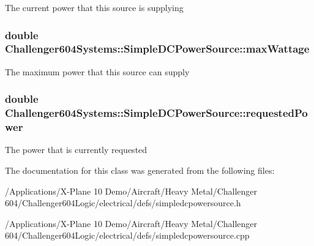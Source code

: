 The current power that this source is supplying \hypertarget{class_challenger604_systems_1_1_simple_d_c_power_source_a7ccc3391b03c04b09f6792e0a44b026b}{
\subsubsection[{max\-Wattage}]{\setlength{\rightskip}{0pt plus 5cm}double Challenger604\-Systems\-::\-Simple\-D\-C\-Power\-Source\-::max\-Wattage\hspace{0.3cm}{\ttfamily [protected]}}}\label{class_challenger604_systems_1_1_simple_d_c_power_source_a7ccc3391b03c04b09f6792e0a44b026b}
The maximum power that this source can supply \hypertarget{class_challenger604_systems_1_1_simple_d_c_power_source_a37f983774689318c3cb0295380ce4bd7}{
\subsubsection[{requested\-Power}]{\setlength{\rightskip}{0pt plus 5cm}double Challenger604\-Systems\-::\-Simple\-D\-C\-Power\-Source\-::requested\-Power\hspace{0.3cm}{\ttfamily [protected]}}}\label{class_challenger604_systems_1_1_simple_d_c_power_source_a37f983774689318c3cb0295380ce4bd7}
The power that is currently requested 

The documentation for this class was generated from the following files\-:\begin{DoxyCompactItemize}
\item 
/\-Applications/\-X-\/\-Plane 10 Demo/\-Aircraft/\-Heavy Metal/\-Challenger 604/\-Challenger604\-Logic/electrical/defs/simpledcpowersource.\-h\item 
/\-Applications/\-X-\/\-Plane 10 Demo/\-Aircraft/\-Heavy Metal/\-Challenger 604/\-Challenger604\-Logic/electrical/defs/simpledcpowersource.\-cpp\end{DoxyCompactItemize}
